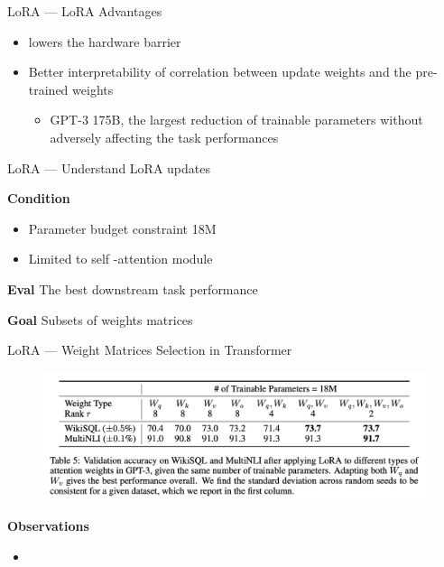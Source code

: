 \documentclass[aspectratio=169,xcolor=dvipsnames]{beamer}
\begin{document}

\begin{frame}{LoRA --- LoRA Advantages}
    \begin{itemize}
        \item lowers the hardware barrier
        \item Better interpretability of correlation between update weights and the pre-trained weights
        \begin{itemize}
            \item GPT-3 175B, the largest reduction of trainable parameters without adversely affecting the task performances
        \end{itemize}
    \end{itemize}
\end{frame}


\begin{frame}{LoRA --- Understand LoRA updates}
    

    \textbf{Condition}
    \begin{itemize}
        \item Parameter budget constraint 18M
        \item Limited to self -attention module
    \end{itemize}
    \textbf{Eval} The best downstream task performance

    \textbf{Goal} Subsets of weights matrices
\end{frame}


\begin{frame}{LoRA --- Weight Matrices Selection in Transformer}
    \begin{figure}
        \centering
        \label{budget_parameter}
        \includegraphics[width=0.8 \linewidth]{figures/budget_parameter.png}
    \end{figure} 
    \textbf{Observations}
    \begin{itemize}
        \item 
    \end{itemize} 
\end{frame}
\end{document}
